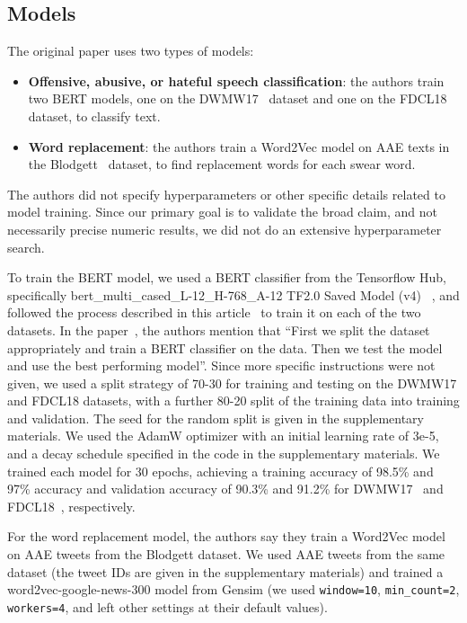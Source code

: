\subsection{Models}

The original paper uses two types of models:

\begin{itemize}
    \item \textbf{Offensive, abusive, or hateful speech classification}: the authors train two BERT models, one on the DWMW17~\cite{davidson} dataset and one on the FDCL18~\cite{founta} dataset, to classify text.
    \item \textbf{Word replacement}: the authors train a Word2Vec model on AAE texts in the Blodgett~\cite{blodgett} dataset, to find replacement words for each swear word.
\end{itemize}

The authors did not specify hyperparameters or other specific details related to model training. Since our primary goal is to validate the broad claim, and not necessarily precise numeric results, we did not do an extensive hyperparameter search.  

To train the BERT model, we used a BERT classifier from the Tensorflow Hub, specifically bert\_multi\_cased\_L-12\_H-768\_A-12 TF2.0 Saved Model (v4)
~\cite{bert}, and followed the process described in this article~\cite{tensorflow_source_code} to train it on each of the two datasets\cite{davidson, founta}. In the paper~\cite{aae_paper}, the authors mention that ``First we split the dataset appropriately and train a BERT classifier on the data. Then we test the model and use the best performing model''. Since more specific instructions were not given, we used a split strategy of 70-30 for training and testing on the DWMW17\cite{davidson} and FDCL18\cite{founta} datasets, with a further 80-20 split of the training data into training and validation.  The seed for the random split is given in the supplementary materials. We used the AdamW optimizer with an initial learning rate of 3e-5, and a decay schedule specified in the code in the supplementary materials. We trained each model for 30 epochs, achieving a training accuracy of 98.5\% and 97\% accuracy and validation accuracy of 90.3\% and 91.2\% for DWMW17~\cite{davidson} and FDCL18~\cite{founta}, respectively.

For the word replacement model, the authors say they train a Word2Vec model on AAE tweets from the Blodgett dataset.  We used AAE tweets from the same dataset (the tweet IDs are given in the supplementary materials) and trained a word2vec-google-news-300 model from Gensim\cite{rehurek2011gensim} (we used \texttt{window=10}, \texttt{min\_count=2},  \texttt{workers=4}, and left other settings at their default values).


